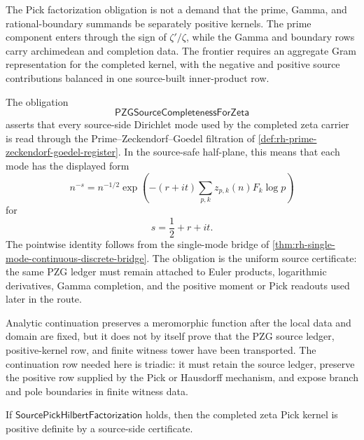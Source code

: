 \begin{principle}
\label{prin:rh-source-pick-factorization-aggregate-balance}
The Pick factorization obligation is not a demand that the prime,
Gamma, and rational-boundary summands be separately positive kernels.
The prime component enters through the sign of $\zeta'/\zeta$, while the
Gamma and boundary rows carry archimedean and completion data. The
frontier requires an aggregate Gram representation for the completed
kernel, with the negative and positive source contributions balanced in
one source-built inner-product row.
\end{principle}

\begin{definition}[PZGSourceCompletenessForZeta]
\label{def:rh-pzg-source-completeness-for-zeta}
The obligation
$$
\mathsf{PZGSourceCompletenessForZeta}
$$
asserts that every source-side Dirichlet mode used by the completed zeta
carrier is read through the Prime--Zeckendorf--Goedel filtration of
\autoref{def:rh-prime-zeckendorf-goedel-register}. In the source-safe
half-plane, this means that each mode has the displayed form
$$
n^{-s}
=
n^{-1/2}
\exp\left(
-(r+it)\sum_{p,k}z_{p,k}(n)F_k\log p
\right)
$$
for
$$
s=\frac12+r+it.
$$
The pointwise identity follows from the single-mode bridge of
\autoref{thm:rh-single-mode-continuous-discrete-bridge}. The obligation
is the uniform source certificate: the same PZG ledger must remain
attached to Euler products, logarithmic derivatives, Gamma completion,
and the positive moment or Pick readouts used later in the route.
\end{definition}

\begin{principle}
\label{prin:rh-analytic-continuation-not-source-completeness}
Analytic continuation preserves a meromorphic function after the local
data and domain are fixed, but it does not by itself prove that the PZG
source ledger, positive-kernel row, and finite witness tower have been
transported. The continuation row needed here is triadic: it must retain
the source ledger, preserve the positive row supplied by the Pick or
Hausdorff mechanism, and expose branch and pole boundaries in finite
witness data.
\end{principle}

\begin{theorem}
\label{thm:rh-source-pick-factorization-supplies-positive-witness}
If $\mathsf{SourcePickHilbertFactorization}$ holds, then the completed
zeta Pick kernel is positive definite by a source-side certificate.
\end{theorem}


